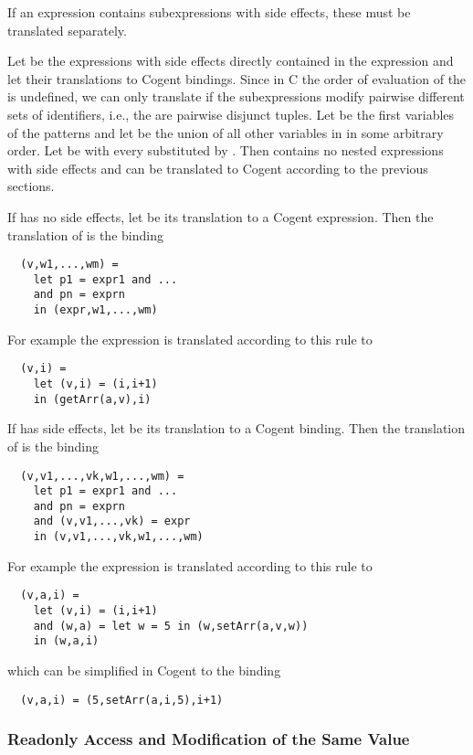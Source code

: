 If an expression contains subexpressions with side effects, these must be translated separately. 

Let  be the expressions with side effects directly contained in the expression  and
let  their translations to Cogent bindings. Since in C the order of evaluation 
of the  is undefined, we can only translate  if the subexpressions
modify pairwise different sets of identifiers, i.e., the  are pairwise disjunct tuples.
Let  be the
first variables of the patterns  and let  be the union of all other variables
in  in some arbitrary order. Let  be  with every 
substituted by . Then  contains no nested expressions with side effects and can be translated
to Cogent according to the previous sections.

If  has no side effects, let  be its translation to a Cogent expression. Then the translation 
of  is the binding
\begin{verbatim}
  (v,w1,...,wm) = 
    let p1 = expr1 and ...
    and pn = exprn 
    in (expr,w1,...,wm)
\end{verbatim}
For example the expression  is translated according to this rule to
\begin{verbatim}
  (v,i) = 
    let (v,i) = (i,i+1)
    in (getArr(a,v),i)
\end{verbatim}

If  has side effects, let  be its translation to a Cogent binding. Then
the translation of  is the binding
\begin{verbatim}
  (v,v1,...,vk,w1,...,wm) = 
    let p1 = expr1 and ...
    and pn = exprn 
    and (v,v1,...,vk) = expr
    in (v,v1,...,vk,w1,...,wm)
\end{verbatim}
For example the expression  is translated according to this rule to
\begin{verbatim}
  (v,a,i) = 
    let (v,i) = (i,i+1)
    and (w,a) = let w = 5 in (w,setArr(a,v,w))
    in (w,a,i)
\end{verbatim}
which can be simplified in Cogent to the binding
\begin{verbatim}
  (v,a,i) = (5,setArr(a,i,5),i+1)
\end{verbatim}

\subsubsection{Readonly Access and Modification of the Same Value}

